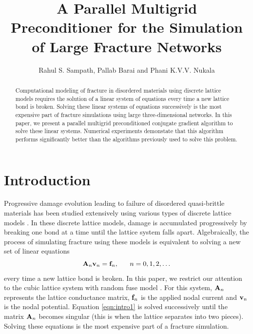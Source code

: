 \documentclass[11pt]{iopart}
\begin{document}
\title{A Parallel Multigrid Preconditioner for the Simulation of Large Fracture Networks}

\author{Rahul S. Sampath, Pallab Barai and Phani K.V.V. Nukala}
\address{Computer Science and Mathematics Division, 
Oak Ridge National Laboratory, Oak Ridge, TN 37831-6164, USA}

\begin{abstract}
Computational modeling of fracture in disordered materials using discrete 
lattice models requires the solution of a linear system of equations every time a new lattice 
bond is broken. Solving these linear systems of equations successively is the most expensive
 part of fracture simulations using large three-dimensional networks. In this paper, we present a 
 parallel multigrid preconditioned conjugate gradient algorithm to solve these
 linear systems. Numerical experiments demonstate that this algorithm performs significantly
 better than the algorithms previously used to solve this problem.
\end{abstract}

\section{Introduction}
\label{sec:intro}
Progressive damage evolution leading to failure of disordered
quasi-brittle materials has been studied extensively using various types of discrete lattice models
\cite{hansen00, advphys}. 
In these discrete lattice models, damage is accumulated progressively by breaking one bond at a time until the 
lattice system falls apart. Algebraically, the process of simulating fracture using these models 
is equivalent to solving a new set of linear equations 
\begin{equation}
\label{eqn:intro1}
{\bf A}_n  {\bf v}_n = {\bf f}_n, ~~~~~ n = 0,1,2,\ldots
\end{equation}
every time a new lattice bond is broken. In this paper, we restrict our attention to the 
cubic lattice system with random fuse model \cite{deArcangelis85}. For this system, 
${\bf A}_n$ represents the lattice conductance matrix, ${\bf f}_n$ is the applied nodal current
 and ${\bf v}_n$ is the nodal potential. Equation \ref{eqn:intro1} is solved successively until the matrix 
${\bf A}_n$ becomes singular (this is when the lattice separates into two pieces). Solving these
equations is the most expensive part of a fracture simulation. 
\end{document}
